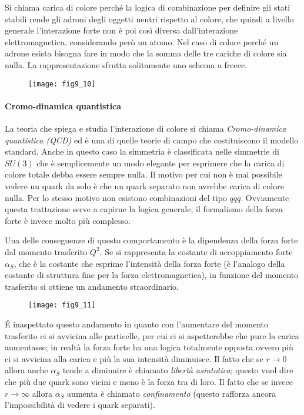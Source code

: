 Si chiama carica di colore perché la logica di combinazione per definire gli stati stabili rende gli adroni degli oggetti neutri rispetto al colore, che quindi a livello generale l'interazione forte non è poi così diversa dall'interazione elettromagnetica, considerando però un atomo.
Nel caso di colore perché un adrone esista bisogna fare in modo che la somma delle tre cariche di colore sia nulla.
La rappresentazione sfrutta solitamente uno schema a frecce.
\begin{figure}
\centering
\texttt{[image: fig9\_10]}
\end{figure}

\paragraph{Cromo-dinamica quantistica}
La teoria che spiega e studia l'interazione di colore si chiama \emph{Cromo-dinamica quantistica (QCD)} ed è una di quelle teorie di campo che costituiscono il modello standard.
Anche in questo caso la simmetria è classificata nelle simmetrie di $SU(3)$ che è semplicemente un modo elegante per esprimere che la carica di colore totale debba essere sempre nulla.
Il motivo per cui non è mai possibile vedere un quark da solo è che un quark separato non avrebbe carica di colore nulla.
Per lo stesso motivo non esistono combinazioni del tipo $qq\bar{q}$.
Ovviamente questa trattazione serve a capirne la logica generale, il formalismo della forza forte è invece molto più complesso.

Una delle conseguenze di questo comportamento è la dipendenza della forza forte dal momento trasferito $Q^2$.
Se si rappresenta la costante di accoppiamento forte $\alpha_S$, che è la costante che esprime l'intensità della forza forte (è l'analogo della costante di struttura fine per la forza elettromagnetica), in funzione del momento trasferito si ottiene un andamento straordinario.
\begin{figure}
\centering
\texttt{[image: fig9\_11]}
\end{figure}

\'E inaspettato questo andamento in quanto con l'aumentare del momento trasferito ci si avvicina alle particelle, per cui ci si aspetterebbe che pure la carica aumentasse; in realtà la forza forte ha una logica totalmente opposta ovvero più ci si avvicina alla carica e più la sua intensità diminuisce.
Il fatto che se $r\to 0$ allora anche $\alpha_S$ tende a diminuire è chiamato \emph{libertà asintotica}; questo vuol dire che più due quark sono vicini e meno è la forza tra di loro.
Il fatto che se invece $r\to \infty$ allora $\alpha_S$ aumenta è chiamato \emph{confinamento} (questo rafforza ancora l'impossibilità di vedere i quark separati).

